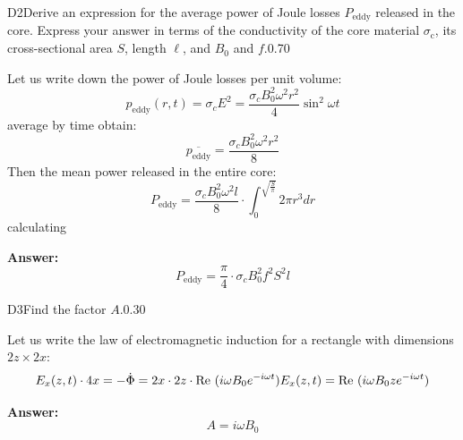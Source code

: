 \documentclass[11pt,a4paper]{article}
\begin{document}
\begin{solcard}{D2}{Derive an expression for the average power of Joule losses $P_\mathrm{eddy}$ released in the core. Express your answer in terms of the conductivity of the core material $\sigma_\mathrm c$, its cross-sectional area $S$, length $\ell$, and $B_0$ and $f$.}{0.70}

Let us write down the power of Joule losses per unit volume: $$ p_\mathrm{eddy}(r, t) = \sigma_c E^2=\frac{\sigma_c B_0^2 \omega^2 r^2}{4}\sin^2\omega t $$average by time obtain: $$ \overline{p_\mathrm{eddy}} = \frac{\sigma_c B_0^2 \omega^2 r^2}{8} $$Then the mean power released in the entire core: $$ P_\mathrm{eddy} = \frac{\sigma_c B_0^2 \omega^2 l}{8} \cdot \int_0^{\sqrt{\frac{S}{\pi}}}2\pi r^3 dr $$calculating

\par\smallskip\noindent\textbf{Answer:} $$ P_\mathrm{eddy}  = \frac{\pi}{4}\cdot \sigma_c B_0^2 f^2 S^2 l $$
\end{solcard}

\begin{solcard}{D3}{Find the factor $A$.}{0.30}

Let us write the law of electromagnetic induction for a rectangle with dimensions $2z\times 2x$: $$ E_x(z, t)\cdot 4x = -\dot{\Phi} = 2x\cdot 2z\cdot \text{Re}~(i\omega B_0 e^{-i\omega t}) \\ E_x(z,t) =\text{Re}~(i\omega B_0 z e^{-i\omega t}) $$

\par\smallskip\noindent\textbf{Answer:} $$ A = i\omega B_0 $$
\end{solcard}
\end{document}
